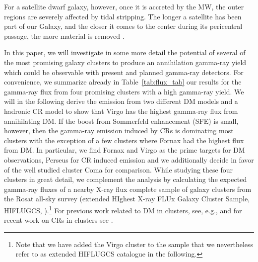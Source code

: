 \documentclass[10pt,aps,pra,reprint,amsmath,amsfonts,amssymb,showpacs,nofootinbib,floatfix]{revtex4-1}
\begin{document}
For a satellite dwarf galaxy, however, once it is accreted by the MW,
the outer regions are severely affected by tidal stripping. The longer
a satellite has been part of our Galaxy, and the closer it comes to
the center during its pericentral passage, the more material is
removed \cite{2004MNRAS.355..819G}.

In this paper, we will investigate in some more detail the potential
of several of the most promising galaxy clusters to produce an
annihilation gamma-ray yield which could be observable with present
and planned gamma-ray detectors. For convenience, we summarize already
in Table~\ref{tab:flux_tab} our results for the gamma-ray flux from
four promising clusters with a high gamma-ray yield. We will in the
following derive the emission from two different DM models and a
hadronic CR model to show that Virgo has the highest gamma-ray flux
from annihilating DM. If the boost from Sommerfeld enhancement (SFE)
is small, however, then the gamma-ray emission induced by CRs is
dominating most clusters with the exception of a few clusters where
Fornax had the highest flux from DM. In particular, we find Fornax and
Virgo as the prime targets for DM observations, Perseus for CR induced
emission and we additionally decide in favor of the well studied
cluster Coma for comparison. While studying these four clusters in
great detail, we complement the analysis by calculating the expected
gamma-ray fluxes of a nearby X-ray flux complete sample of galaxy
clusters from the Rosat all-sky survey (extended HIghest X-ray FLUx
Galaxy Cluster Sample, HIFLUGCS,
\citealt{2002ApJ...567..716R,2007A&A...466..805C}).\footnote{Note that
  we have added the Virgo cluster to the sample that we nevertheless
  refer to as extended HIFLUGCS catalogue in the following.}  For
previous work related to DM in clusters, see, e.g.,
\cite{2006A&A...455...21C,2009PhRvD..80b3005J,2011arXiv1104.3530S,2011ApJ...726L...6C,2010JCAP...05..025A}
and for recent work on CRs in clusters see
\cite{2010MNRAS.409..449P,2011MNRAS.410..127B,2008MNRAS.385.1211P,2009JCAP...08..002K,2010MNRAS.407.1565D}.
\end{document}
